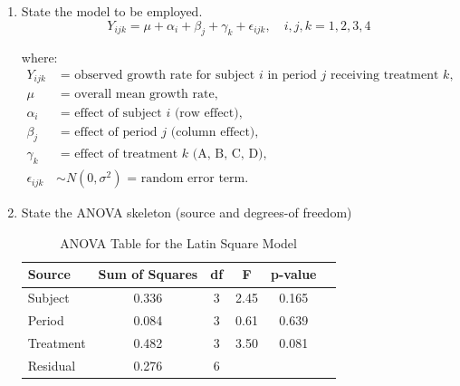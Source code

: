 \documentclass{article}
\begin{document}
\begin{enumerate}
	\item State the model to be employed.
	      \begin{equation}
		      Y_{ijk} = \mu + \alpha_i + \beta_j + \gamma_k + \epsilon_{ijk}, \quad i,j,k = 1,2,3,4
	      \end{equation}

	      \noindent where:
	      \begin{align*}
		      Y_{ijk}        & \text{ = observed growth rate for subject } i \text{ in period } j \text{ receiving treatment } k, \\
		      \mu            & \text{ = overall mean growth rate},                                                                \\
		      \alpha_i       & \text{ = effect of subject } i \text{ (row effect)},                                               \\
		      \beta_j        & \text{ = effect of period } j \text{ (column effect)},                                             \\
		      \gamma_k       & \text{ = effect of treatment } k \text{ (A, B, C, D)},                                             \\
		      \epsilon_{ijk} & \sim N(0, \sigma^2) \text{ = random error term}.
	      \end{align*}
	\item State the ANOVA skeleton (source and degrees-of freedom)
	      \begin{table}[!ht]
		      \centering
		      \caption{ANOVA Table for the Latin Square Model}
		      \begin{tabular}{lccccc}
			      \hline
			      \textbf{Source} & \textbf{Sum of Squares} & \textbf{df} & \textbf{F} & \textbf{p-value} \\
			      \hline
			      Subject         & 0.336                   & 3           & 2.45       & 0.165            \\
			      Period          & 0.084                   & 3           & 0.61       & 0.639            \\
			      Treatment       & 0.482                   & 3           & 3.50       & 0.081            \\
			      Residual        & 0.276                   & 6           &            &                  \\
			      \hline
		      \end{tabular}
	      \end{table}


\end{enumerate}
\end{document}
